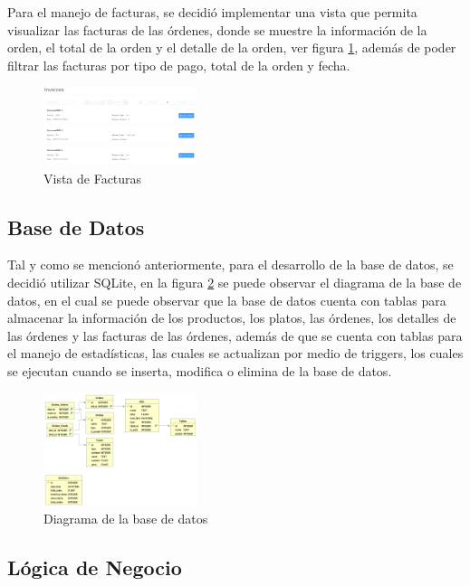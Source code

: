 Para el manejo de facturas, se decidió implementar una vista que permita 
visualizar las facturas de las órdenes, donde se muestre la información de 
la orden, el total de la orden y el detalle de la orden, ver figura 
\ref{fig:invoices}, además de poder filtrar las facturas por tipo de pago, 
total de la orden y fecha.

\begin{figure}[H]
    \centering
    \includegraphics[width=0.4\textwidth]{assets/invoices.png}
    \caption{Vista de Facturas}
    \label{fig:invoices}
\end{figure}

\subsection{Base de Datos}

Tal y como se mencionó anteriormente, para el desarrollo de la base de datos, 
se decidió utilizar SQLite, en la figura \ref{fig:database} se puede 
observar el diagrama de la base de datos, en el cual se puede observar 
que la base de datos cuenta con tablas para almacenar la información de 
los productos, los platos, las órdenes, los detalles de las órdenes y 
las facturas de las órdenes, además de que se cuenta con tablas para 
el manejo de estadísticas, las cuales se actualizan por medio de 
triggers, los cuales se ejecutan cuando se inserta, modifica o elimina 
de la base de datos.

\begin{figure}[H]
    \centering
    \includegraphics[width=0.4\textwidth]{assets/database.png}
    \caption{Diagrama de la base de datos}
    \label{fig:database}
\end{figure}

\subsection{Lógica de Negocio}

